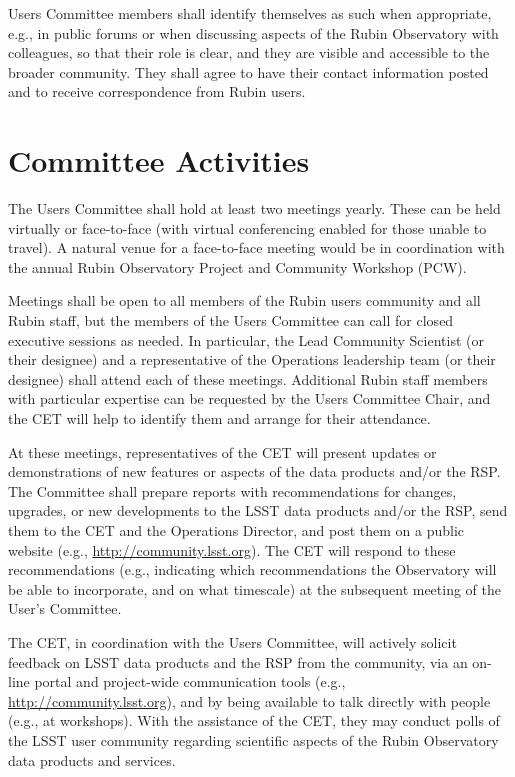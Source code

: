 \documentclass[OPS,toc]{lsstdoc}
\begin{document}
Users Committee members shall identify themselves as such when appropriate, e.g., in public forums or when discussing aspects of the Rubin Observatory with colleagues, so that their role is clear, and they are visible and accessible to the broader community.
They shall agree to have their contact information posted and to receive correspondence from Rubin users.

\section{Committee Activities}

The Users Committee shall hold at least two meetings yearly.
These can be held virtually or face-to-face (with virtual conferencing enabled for those unable to travel).
A natural venue for a face-to-face meeting would be in coordination with the annual Rubin Observatory Project and Community Workshop (PCW).

Meetings shall be open to all members of the Rubin users community and all Rubin staff, but the members of the Users Committee can call for closed executive sessions as needed.
In particular, the Lead Community Scientist (or their designee) and a representative of the Operations leadership team (or their designee) shall attend each of these meetings.
Additional Rubin staff members with particular expertise can be requested by the Users Committee Chair, and the CET will help to identify them and arrange for their attendance.

At these meetings, representatives of the CET will present updates or demonstrations of new features or aspects of the data products and/or the RSP.
The Committee shall prepare reports with recommendations for changes, upgrades, or new developments to the LSST data products and/or the RSP, send them to the CET and the Operations Director, and post them on a public website (e.g., \url{http://community.lsst.org}).
The CET will respond to these recommendations (e.g., indicating which recommendations the Observatory will be able to incorporate, and on what timescale) at the subsequent meeting of the User’s Committee.  

The CET, in coordination with the Users Committee, will actively solicit feedback on LSST data products and the RSP from the community, via an on-line portal and project-wide communication tools (e.g., \url{http://community.lsst.org}), and by being available to talk directly with people (e.g., at workshops).
With the assistance of the CET, they may conduct polls of the LSST user community regarding scientific aspects of the Rubin Observatory data products and services.
\end{document}
